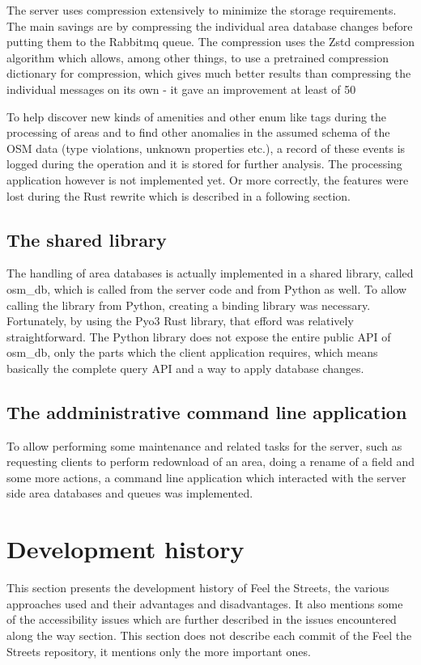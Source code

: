\documentclass[nolof,digital]{fithesis3}
\begin{document}
The server uses compression extensively to minimize the storage requirements. The main savings are by compressing the individual area database changes before putting them to the Rabbitmq queue. The compression uses the Zstd compression algorithm which allows, among other things, to use a pretrained compression dictionary for compression, which gives much better results than compressing the individual messages on its own - it gave an improvement at least of 50%

To help discover new kinds of amenities and other enum like tags during the processing of areas and to find other anomalies in the assumed schema of the OSM data (type violations, unknown properties etc.), a record of these events is logged during the operation and it is stored for further analysis. The processing application however is not implemented yet. Or more correctly, the features were lost during the Rust rewrite which is described in a following section.
\subsection{The shared library}
The handling of area databases is actually implemented in a shared library, called osm_db, which is called from the server code and from Python as well. To allow calling the library from Python, creating a binding library was necessary. Fortunately, by using the Pyo3 Rust library, that efford was relatively straightforward. The Python library does not expose the entire public API of osm_db, only the parts which the client application requires, which means basically the complete query API and a way to apply database changes.
\subsection{The addministrative command line application}
To allow performing some maintenance and related tasks for the server, such as requesting clients to perform redownload of an area, doing a rename of a field and some more actions, a command line application which interacted with the server side area databases and queues was implemented.
\section{Development history}
This section presents the development history of Feel the Streets, the various approaches used and their advantages and disadvantages. It also mentions some of the accessibility issues which are further described in the issues encountered along the way section. This section does not describe each commit of the Feel the Streets repository, it mentions only the more important ones.
\end{document}
